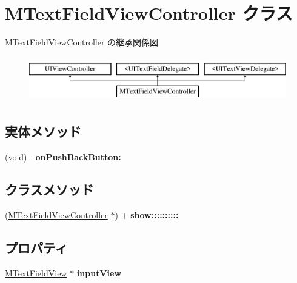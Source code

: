\hypertarget{interface_m_text_field_view_controller}{}\section{M\+Text\+Field\+View\+Controller クラス}
\label{interface_m_text_field_view_controller}
M\+Text\+Field\+View\+Controller の継承関係図\begin{figure}[H]
\begin{center}
\leavevmode
\includegraphics[height=2.000000cm]{interface_m_text_field_view_controller}
\end{center}
\end{figure}
\subsection*{実体メソッド}
\begin{DoxyCompactItemize}
\item 
\hypertarget{interface_m_text_field_view_controller_a428c5187b91e12fec7511f037e9df156}{}(void) -\/ {\bfseries on\+Push\+Back\+Button\+:}\label{interface_m_text_field_view_controller_a428c5187b91e12fec7511f037e9df156}

\end{DoxyCompactItemize}
\subsection*{クラスメソッド}
\begin{DoxyCompactItemize}
\item 
\hypertarget{interface_m_text_field_view_controller_a319878d6a3a35c7c1e4c061816109b84}{}(\hyperlink{interface_m_text_field_view_controller}{M\+Text\+Field\+View\+Controller} $\ast$) + {\bfseries show\+::::::::::}\label{interface_m_text_field_view_controller_a319878d6a3a35c7c1e4c061816109b84}

\end{DoxyCompactItemize}
\subsection*{プロパティ}
\begin{DoxyCompactItemize}
\item 
\hypertarget{interface_m_text_field_view_controller_a3673ef416d56e26e6dc57b4a3d0a5951}{}\hyperlink{interface_m_text_field_view}{M\+Text\+Field\+View} $\ast$ {\bfseries input\+View}\label{interface_m_text_field_view_controller_a3673ef416d56e26e6dc57b4a3d0a5951}

\end{DoxyCompactItemize}


